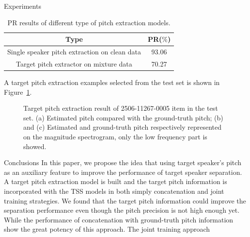 \documentclass[final]{beamer}
\newlength{\colwidth}
\begin{document}
\begin{frame}[t]
\begin{columns}[t]
\begin{column}{\colwidth}
\begin{block}{Experiments}
                    \begin{table}[htbp]
                        \centering
                        \begin{tabular}{c|c}
                            \toprule
                            Type                                          & PR($\%$) \\
                            \midrule
                            Single speaker pitch extraction on clean data & 93.06    \\
                            \midrule
                            Target pitch extractor on mixture data        & 70.27    \\
                            \bottomrule
                        \end{tabular}
                        \caption{PR results of different type of pitch extraction models.}
                        \label{tab:pitch result}
                    \end{table}

                    A target pitch extraction examples selected from the test set is shown in Figure~\ref{fig:pitch_1}.

                    \begin{figure}[t]

                        \caption{Target pitch extraction result of 2506-11267-0005 item in the test set. (a) Estimated pitch compared with the ground-truth pitch; (b) and (c) Estimated and ground-truth pitch respectively represented on the magnitude spectrogram, only the low frequency part is showed. }
                        \label{fig:pitch_1}
                    \end{figure}
                \end{block}


                \begin{block}{Conclusions}
                    In this paper, we propose the idea that using target speaker's pitch as an auxiliary feature to improve the performance of target speaker separation. A target pitch extraction model is built and the target pitch information is incorporated with the TSS models in both simply concatenation and joint training strategies. We found that the target pitch information could improve the separation performance even though the pitch precision is not high enough yet. While the performance of concatenation with ground-truth pitch information show the great potency of this approach. The joint training approach
                \end{block}
            \end{column}


\end{columns}
\end{frame}
\end{document}
